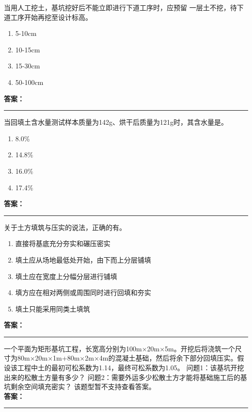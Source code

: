 \documentclass[UTF8,fontset=fandol,11pt]{ctexart}
\newcommand{\answerline}{\textcolor{answerred}{\rule{2.4cm}{0.7pt}}}
\begin{document}
\vspace{0.2em}

\begin{quizbox}[title={第 30 题}]
当用人工挖土，基坑挖好后不能立即进行下道工序时，应预留 一层土不挖，待下道工序开始再挖至设计标高。\\
\begin{enumerate}[label=\Alph*.]
\item 5-10cm
\item 10-15cm
\item 15-30cm
\item 50-100cm
\end{enumerate}
\textbf{\textcolor{answerred}{答案：}} \answerline
\end{quizbox}

\vspace{0.2em}

\begin{quizbox}[title={第 31 题}]
当回填土含水量测试样本质量为142g、烘干后质量为121g时，其含水量是。\\
\begin{enumerate}[label=\Alph*.]
\item 8.0\%
\item 14.8\%
\item 16.0\%
\item 17.4\%
\end{enumerate}
\textbf{\textcolor{answerred}{答案：}} \answerline
\end{quizbox}

\vspace{0.2em}

\begin{quizbox}[title={第 32 题}]
关于土方填筑与压实的说法，正确的有。\\
\begin{enumerate}[label=\Alph*.]
\item 直接将基底充分夯实和碾压密实
\item 填土应从场地最低处开始，由下而上分层铺填
\item 填土应在宽度上分幅分层进行铺填
\item 填方应在相对两侧或周围同时进行回填和夯实
\item 填土只能采用同类土填筑
\end{enumerate}
\textbf{\textcolor{answerred}{答案：}} \answerline
\end{quizbox}

\vspace{0.2em}

\begin{quizbox}[title={第 33 题}]
一个平面为矩形基坑工程，长宽高分别为100m×20m×5m。开挖后将浇筑一个尺寸为80m×20m×1m+80m×2m×4m的混凝土基础，然后将余下部分回填压实。假设该工程中土的最初可松系数为1.14，最终可松系数为1.05。 问题1：该基坑开挖出来的松散土方量有多少？ 问题2：需要外运多少松散土方才能将基础施工后的基坑剩余空间填充密实？ 该题型暂不支持查看答案。\\
\textbf{\textcolor{answerred}{答案：}} \answerline
\end{quizbox}
\end{document}
